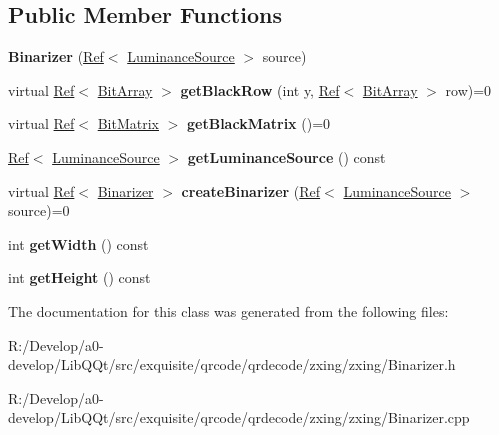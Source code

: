 \subsection*{Public Member Functions}
\begin{DoxyCompactItemize}
\item 
\mbox{\label{classzxing_1_1_binarizer_a10571c7035558595fc4a65f1d38a963d}} 
{\bfseries Binarizer} (\mbox{\hyperlink{classzxing_1_1_ref}{Ref}}$<$ \mbox{\hyperlink{classzxing_1_1_luminance_source}{Luminance\+Source}} $>$ source)
\item 
\mbox{\label{classzxing_1_1_binarizer_a019d36d8d4f1f6ba2ff9bf9bfd8c9064}} 
virtual \mbox{\hyperlink{classzxing_1_1_ref}{Ref}}$<$ \mbox{\hyperlink{classzxing_1_1_bit_array}{Bit\+Array}} $>$ {\bfseries get\+Black\+Row} (int y, \mbox{\hyperlink{classzxing_1_1_ref}{Ref}}$<$ \mbox{\hyperlink{classzxing_1_1_bit_array}{Bit\+Array}} $>$ row)=0
\item 
\mbox{\label{classzxing_1_1_binarizer_a4fe8fd9a5b3a99db426fccb33852a3a0}} 
virtual \mbox{\hyperlink{classzxing_1_1_ref}{Ref}}$<$ \mbox{\hyperlink{classzxing_1_1_bit_matrix}{Bit\+Matrix}} $>$ {\bfseries get\+Black\+Matrix} ()=0
\item 
\mbox{\label{classzxing_1_1_binarizer_a04dca92bcb05d71a66720ceaf18f5adf}} 
\mbox{\hyperlink{classzxing_1_1_ref}{Ref}}$<$ \mbox{\hyperlink{classzxing_1_1_luminance_source}{Luminance\+Source}} $>$ {\bfseries get\+Luminance\+Source} () const
\item 
\mbox{\label{classzxing_1_1_binarizer_a5f8f8692f8706f6a41f9c5a12464ccde}} 
virtual \mbox{\hyperlink{classzxing_1_1_ref}{Ref}}$<$ \mbox{\hyperlink{classzxing_1_1_binarizer}{Binarizer}} $>$ {\bfseries create\+Binarizer} (\mbox{\hyperlink{classzxing_1_1_ref}{Ref}}$<$ \mbox{\hyperlink{classzxing_1_1_luminance_source}{Luminance\+Source}} $>$ source)=0
\item 
\mbox{\label{classzxing_1_1_binarizer_ab3f79809eea04e85eba70e9db532fa0c}} 
int {\bfseries get\+Width} () const
\item 
\mbox{\label{classzxing_1_1_binarizer_aa74575cc0068c66c29283daf5b01ef27}} 
int {\bfseries get\+Height} () const
\end{DoxyCompactItemize}


The documentation for this class was generated from the following files\+:\begin{DoxyCompactItemize}
\item 
R\+:/\+Develop/a0-\/develop/\+Lib\+Q\+Qt/src/exquisite/qrcode/qrdecode/zxing/zxing/Binarizer.\+h\item 
R\+:/\+Develop/a0-\/develop/\+Lib\+Q\+Qt/src/exquisite/qrcode/qrdecode/zxing/zxing/Binarizer.\+cpp\end{DoxyCompactItemize}
